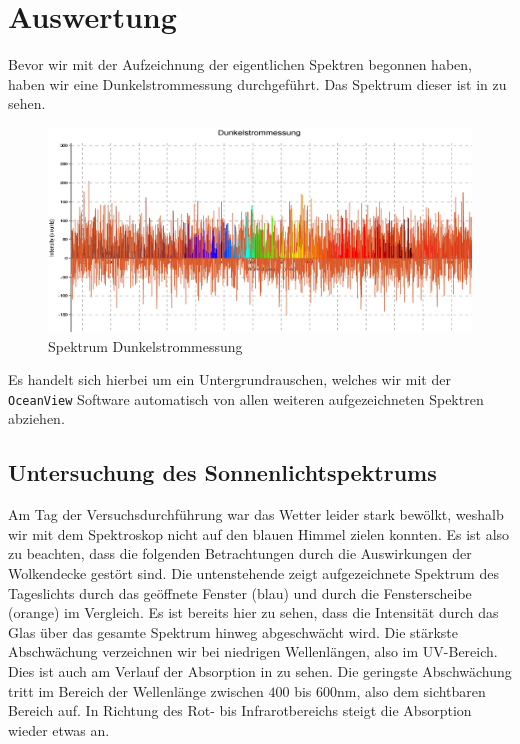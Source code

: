 \section{Auswertung}

Bevor wir mit der Aufzeichnung der eigentlichen Spektren begonnen haben, haben wir eine Dunkelstrommessung durchgeführt. Das Spektrum dieser ist in  zu sehen.

\begin{figure}[H]
  \centering
  \includegraphics[width=.9\textwidth]{files/pngs/dunkelstrommessung.png}
  \caption{Spektrum Dunkelstrommessung}
  \label{fig:dunkelstrommessung}  
\end{figure}

Es handelt sich hierbei um ein Untergrundrauschen, welches wir mit der \texttt{OceanView} Software automatisch von allen weiteren aufgezeichneten Spektren abziehen.

\subsection{Untersuchung des Sonnenlichtspektrums}

Am Tag der Versuchsdurchführung war das Wetter leider stark bewölkt, weshalb wir mit dem Spektroskop nicht auf den blauen Himmel zielen konnten. Es ist also zu beachten, dass die folgenden Betrachtungen durch die Auswirkungen der Wolkendecke gestört sind. Die untenstehende  zeigt aufgezeichnete Spektrum des Tageslichts durch das geöffnete Fenster (blau) und durch die Fensterscheibe (orange) im Vergleich. Es ist bereits hier zu sehen, dass die Intensität durch das Glas über das gesamte Spektrum hinweg abgeschwächt wird. Die stärkste Abschwächung verzeichnen wir bei niedrigen Wellenlängen, also im UV-Bereich. Dies ist auch am Verlauf der Absorption in  zu sehen. Die geringste Abschwächung tritt im Bereich der Wellenlänge zwischen $400$ bis $600\si{\nano\meter}$, also dem sichtbaren Bereich auf. In Richtung des Rot- bis Infrarotbereichs steigt die Absorption wieder etwas an.

